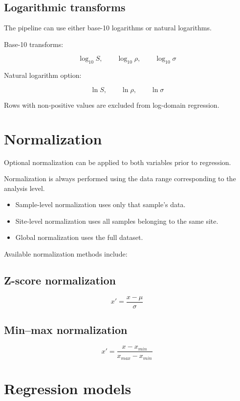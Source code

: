 \documentclass[11pt]{article}
\begin{document}
\subsection{Logarithmic transforms}

The pipeline can use either base-10 logarithms or natural logarithms.

Base-10 transforms:

\[
\log_{10} S,\qquad
\log_{10} \rho,\qquad
\log_{10} \sigma
\]

Natural logarithm option:

\[
\ln S,\qquad
\ln \rho,\qquad
\ln \sigma
\]

Rows with non-positive values are excluded from log-domain regression.

\section{Normalization}

Optional normalization can be applied to both variables prior to regression.

Normalization is always performed using the data range corresponding to the analysis level.

\begin{itemize}
\item Sample-level normalization uses only that sample's data.
\item Site-level normalization uses all samples belonging to the same site.
\item Global normalization uses the full dataset.
\end{itemize}

Available normalization methods include:

\subsection{Z-score normalization}

\[
x' = \frac{x - \mu}{\sigma}
\]

\subsection{Min–max normalization}

\[
x' = \frac{x - x_{min}}{x_{max} - x_{min}}
\]

\section{Regression models}
\end{document}
